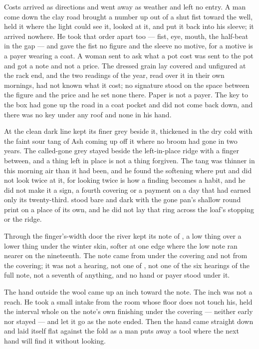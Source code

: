 Costs arrived as directions and went away as weather and left no entry. A man come down the clay road brought a number up out of a shut fist toward the well, held it where the light could see it, looked at it, and put it back into his sleeve; it arrived nowhere. He took that order apart too --- fist, eye, mouth, the half-beat in the gap --- and gave the fist no figure and the sleeve no motive, for a motive is a payer wearing a coat. A woman sent to ask what a pot cost was sent to the pot and got a note and not a price. The dressed grain lay covered and unfigured at the rack end, and the two readings of the year, read over it in their own mornings, had not known what it cost; no signature stood on the space between the figure and the price and he set none there. Paper is not a payer. The key to the box had gone up the road in a coat pocket and did not come back down, and there was no key under any roof and none in his hand.

At  the clean dark line kept its finer grey beside it, thickened in the dry cold with the faint sour tang of Ash coming up off it where no broom had gone in two years. The called-gone grey stayed beside the left-in-place ridge with a finger between, and a thing left in place is not a thing forgiven. The tang was thinner in this morning air than it had been, and he found the softening where put and did not look twice at it, for looking twice is how a finding becomes a habit, and he did not make it a sign, a fourth covering or a payment on a day that had earned only its twenty-third.  stood bare and dark with the gone pan's shallow round print on a place of its own, and he did not lay that ring across the loaf's stopping or the ridge.

\scenebreak

Through the finger's-width door the river kept its note of , a low thing over a lower thing under the winter skin, softer at one edge where the low note ran nearer on the nineteenth. The note came from under the covering and not from the covering; it was not a hearing, not one of , not one of the six hearings of the full note, not a seventh of anything, and no hand or payer stood under it.

The hand outside the wool came up an inch toward the note. The inch was not a reach. He took a small intake from the room whose floor does not touch his, held the interval whole on the note's own finishing under the covering --- neither early nor stayed --- and let it go as the note ended. Then the hand came straight down and laid itself flat against the fold as a man puts away a tool where the next hand will find it without looking.

